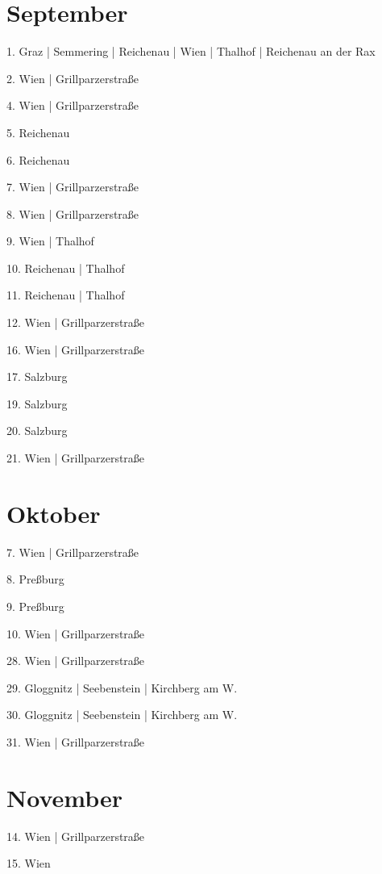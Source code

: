 \documentclass[twoside=false,titlepage=false,open=any, parskip=never, fontsize=10pt, headings=small, chapterprefix=false, appendixprefix=false, DIV=15]{scrbook}
\begin{document}
\begin{multicols}{3}
            \section*{September}
            1. Graz | Semmering | Reichenau | Wien | Thalhof | Reichenau an der Rax\par
            2. Wien | Grillparzerstraße\par
            4. Wien | Grillparzerstraße\par
            5. Reichenau\par
            6. Reichenau\par
            7. Wien | Grillparzerstraße\par
            8. Wien | Grillparzerstraße\par
            9. Wien | Thalhof\par
            10. Reichenau | Thalhof\par
            11. Reichenau | Thalhof\par
            12. Wien | Grillparzerstraße\par
            16. Wien | Grillparzerstraße\par
            17. Salzburg\par
            19. Salzburg\par
            20. Salzburg\par
            21. Wien | Grillparzerstraße\par
            \section*{Oktober}
            7. Wien | Grillparzerstraße\par
            8. Preßburg\par
            9. Preßburg\par
            10. Wien | Grillparzerstraße\par
            28. Wien | Grillparzerstraße\par
            29. Gloggnitz | Seebenstein | Kirchberg am W.\par
            30. Gloggnitz | Seebenstein | Kirchberg am W.\par
            31. Wien | Grillparzerstraße\par
            \section*{November}
            14. Wien | Grillparzerstraße\par
            15. Wien\par

\end{multicols}
\end{document}
